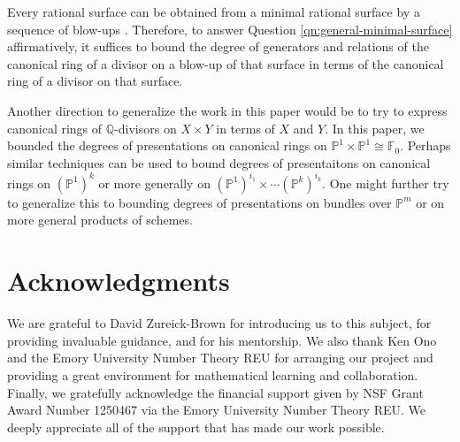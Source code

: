 \documentclass{amsart}
\theoremstyle{plain}
\theoremstyle{definition}
\theoremstyle{remark}
\numberwithin{equation}{section}
\newcommand\bq{{\mathbb Q}}
\newcommand\bp{{\mathbb P}}
\newcommand\hirz{\mathbb{F}}
\begin{document}
Every rational surface can be obtained from a minimal rational surface by a 
sequence of blow-ups \cite{eisenbud-harris:minimal}. Therefore, to answer 
Question \ref{qn:general-minimal-surface} affirmatively, it suffices
to bound the degree of generators and relations of the 
canonical ring of a divisor on a blow-up of that surface in terms of the canonical ring of a divisor on that surface.

Another direction to generalize the work in this paper
would be to try to express canonical rings of $\bq$-divisors on
$X \times Y$ in terms of $X$ and $Y$. In this paper,
we bounded the degrees of presentations on canonical rings on $\bp^1 \times \bp^1 \cong \hirz_0$.
Perhaps similar techniques can be used to bound
degrees of presentaitons on canonical rings on $(\bp^1)^k$ or
more generally on $(\bp^1)^{i_1} \times \cdots (\bp^k)^{i_k}.$
One might further try to generalize this to bounding degrees of presentations on bundles over $\bp^m$ or on more general
products of schemes.


\section{Acknowledgments}
\label{sec:ack}
We are grateful to David Zureick-Brown for introducing us to this
subject, for providing invaluable guidance,
and for his mentorship. We also thank Ken Ono and the
Emory University Number Theory REU for arranging our project and
providing a great environment for mathematical learning and
collaboration.
Finally, we gratefully acknowledge the financial support given by
NSF Grant Award Number 1250467 via the Emory University Number
Theory REU. We deeply appreciate all of the support that has made
our work possible.


\nocite{*}
{}

\end{document}
